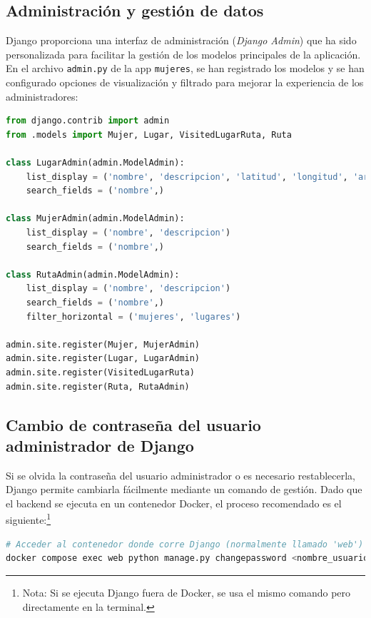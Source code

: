 \subsection{Administración y gestión de datos}

Django proporciona una interfaz de administración (\textit{Django Admin}) que ha sido personalizada para facilitar la gestión de los modelos principales de la aplicación. En el archivo \texttt{admin.py} de la app \texttt{mujeres}, se han registrado los modelos y se han configurado opciones de visualización y filtrado para mejorar la experiencia de los administradores:

\begin{lstlisting}[language=Python, caption={Registro del modelo Mujer en Django Admin}]
from django.contrib import admin
from .models import Mujer, Lugar, VisitedLugarRuta, Ruta

class LugarAdmin(admin.ModelAdmin):
    list_display = ('nombre', 'descripcion', 'latitud', 'longitud', 'ar_url')
    search_fields = ('nombre',)

class MujerAdmin(admin.ModelAdmin):
    list_display = ('nombre', 'descripcion')
    search_fields = ('nombre',)

class RutaAdmin(admin.ModelAdmin):
    list_display = ('nombre', 'descripcion')
    search_fields = ('nombre',)
    filter_horizontal = ('mujeres', 'lugares')

admin.site.register(Mujer, MujerAdmin)
admin.site.register(Lugar, LugarAdmin)
admin.site.register(VisitedLugarRuta)
admin.site.register(Ruta, RutaAdmin)
\end{lstlisting}

\subsection{Cambio de contraseña del usuario administrador de Django}

Si se olvida la contraseña del usuario administrador o es necesario restablecerla, Django permite cambiarla fácilmente mediante un comando de gestión. Dado que el backend se ejecuta en un contenedor Docker, el proceso recomendado es el siguiente:\footnote{Nota: Si se ejecuta Django fuera de Docker, se usa el mismo comando pero directamente en la terminal.}

\begin{lstlisting}[language=bash, caption={Cambio de contraseña del usuario administrador en Docker}]
# Acceder al contenedor donde corre Django (normalmente llamado 'web')
docker compose exec web python manage.py changepassword <nombre_usuario>
\end{lstlisting}

